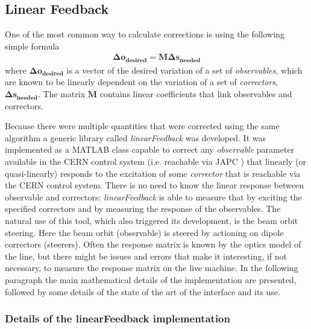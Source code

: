 \subsection{Linear Feedback}
%
One of the most common way to calculate corrections is using the following simple formula
%
\begin{align}
\bm{\Delta o_{\text{desired}}} = \bm{M} \bm{\Delta s_{\text{needed}}} 
\label{eq:linearSystemSimple}
\end{align}
%
where $\bm{\Delta o_{\text{desired}}}$ is a vector of the desired variation of a set of
\emph{observables}, which are known to be linearly dependent on the variation of a set of
\emph{correctors}, $\bm{\Delta s_{\text{needed}}}$.
The matrix $\bm{M}$ contains linear coefficients that link observables and correctors. 

Because there were multiple quantities that were corrected using the same algorithm a generic 
library called  \emph{linearFeedback} was developed.
It was implemented as a MATLAB class capable to correct any \emph{observable} parameter available in 
the CERN control system (i.e. reachable via JAPC \cite{Baggiolini:2005}) that 
linearly (or quasi-linearly) responds to the excitation of some
\emph{corrector} that is reachable via the CERN control system.
There is no need to know the linear response between observable and correctors: \emph{linearFeedback} is
able to measure that by exciting the specified correctors and by measuring the response of the
observables.
The natural use of this tool, which also triggered its development, is the beam orbit steering.
Here the beam orbit (observable) is steered by actioning on dipole correctors (steerers).
Often the response matrix is known by the optics model of the line, but there might be issues and
errors that make it interesting, if not necessary, to measure the response matrix on the live machine.
In the following paragraph the main mathematical details of the implementation are presented, followed
by some details of the state of the art of the interface and its use.


\subsubsection{Details of the linearFeedback implementation}
\label{sub:detailLinearFeedback}

